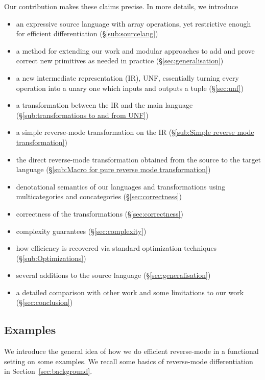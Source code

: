 Our contribution makes these claims precise. In more details, we introduce
\begin{itemize}
    \item an expressive source language with array operations, yet restrictive enough for efficient differentiation (\S\ref{sub:sourcelang})
    \item a method for extending our work and modular approaches to add and prove correct new primitives as needed in practice (\S\ref{sec:generalisation})
    \item a new intermediate representation (IR), UNF, essentially turning every operation into a unary one which inputs and outputs a tuple (\S\ref{sec:unf})
    \item a transformation between the IR and the main language (\S\ref{sub:transformations to and from UNF})
    \item a simple reverse-mode transformation on the IR (\S\ref{sub:Simple reverse mode transformation})
    \item the direct reverse-mode transformation obtained from the source to the target language (\S\ref{sub:Macro for pure reverse mode transformation})
    \item denotational semantics of our languages and transformations using multicategories and concategories (\S\ref{sec:correctness})
    \item correctness of the transformations (\S\ref{sec:correctness})
    \item complexity guarantees (\S\ref{sec:complexity})
    \item how efficiency is recovered via standard optimization techniques (\S\ref{sub:Optimizations})
    \item several additions to the source language (\S\ref{sec:generalisation}) 
    \item a detailed comparison with other work and some limitations to our work (\S\ref{sec:conclusion})
\end{itemize}

\subsection{Examples}

We introduce the general idea of how we do efficient reverse-mode in a functional setting on some examples.
We recall some basics of reverse-mode differentiation in Section~\ref{sec:background}.

